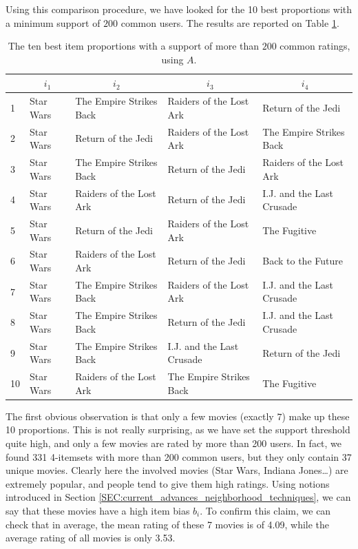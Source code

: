 Using this comparison procedure, we have looked for the 10 best proportions
with a minimum support of $200$ common users. The results are reported on Table
\ref{TAB:best_prop_num_basic_200}.
\begin{table}[h!]
\centering
  \begin{tabular}{l l  l  l l}
\toprule
    &\multicolumn{1}{c}{$i_1$}  & \multicolumn{1}{c}{$i_2$} &
    \multicolumn{1}{c}{$i_3$} & \multicolumn{1}{c}{$i_4$}\\
  \midrule
 1&   Star Wars & The Empire Strikes Back & Raiders of the Lost Ark & Return of the Jedi  \\
 2&   Star Wars & Return of the Jedi & Raiders of the Lost Ark & The Empire Strikes Back  \\
 3&   Star Wars & The Empire Strikes Back & Return of the Jedi & Raiders of the Lost Ark  \\
 4&   Star Wars & Raiders of the Lost Ark & Return of the Jedi & I.J. and the Last Crusade  \\
 5&   Star Wars & Return of the Jedi & Raiders of the Lost Ark & The Fugitive  \\
 6&   Star Wars & Raiders of the Lost Ark & Return of the Jedi & Back to the Future  \\
 7&   Star Wars & The Empire Strikes Back & Raiders of the Lost Ark & I.J. and the Last Crusade  \\
 8&   Star Wars & The Empire Strikes Back & Return of the Jedi & I.J. and the Last Crusade  \\
 9&   Star Wars & The Empire Strikes Back & I.J. and the Last Crusade & Return of the Jedi  \\
 10&   Star Wars & Raiders of the Lost Ark & The Empire Strikes Back & The Fugitive\\
\bottomrule
\end{tabular}
\caption{The ten best item proportions with a support of more than $200$ common
  ratings, using $A$.}
  \label{TAB:best_prop_num_basic_200}
\end{table}

The first obvious observation is that only a few movies (exactly $7$) make up
these 10 proportions. This is not really surprising, as we have set the support
threshold quite high, and only a few movies are rated by more than 200 users.
In fact, we found 331 4-itemsets with more than 200 common users, but they only
contain 37 unique movies. Clearly here the involved movies (Star Wars, Indiana
Jones\dots) are extremely popular, and people tend to give them high ratings.
Using notions introduced in Section
\ref{SEC:current_advances_neighborhood_techniques}, we can say that these
movies have a high item bias $b_i$. To confirm this claim, we can check that in
average, the mean rating of these 7 movies is of 4.09, while the average rating
of all movies is only 3.53.

